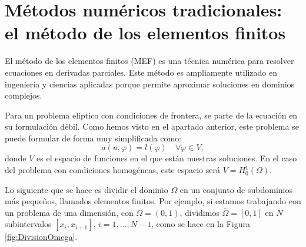 \documentclass[a4paper,11pt,spanish, twoside, leqno]{tfg-uam}
\theoremstyle{definition}
\begin{document}

\section{Métodos numéricos tradicionales: el método de los elementos finitos}

El método de los elementos finitos (MEF) es una técnica numérica para resolver ecuaciones en derivadas parciales. Este método es ampliamente utilizado en ingeniería y ciencias aplicadas porque permite aproximar soluciones en dominios complejos.

Para un problema elíptico con condiciones de frontera, se parte de la ecuación en su formulación débil. Como hemos visto en el apartado anterior, este problema se puede formular de forma muy simplificada como:
\begin{equation*}
    a(u,\varphi) = l(\varphi) \quad \forall \varphi\in V,
\end{equation*}
donde $V$ es el espacio de funciones en el que están nuestras soluciones. En el caso del problema con condiciones homogéneas, este espacio será $V = H_0^1(\Omega)$.

Lo siguiente que se hace es dividir el dominio $\Omega$ en un conjunto de subdominios más pequeños, llamados elementos finitos. Por ejemplo, si estamos trabajando con un problema de una dimensión, con $\Omega =(0,1)$, dividimos $\overline{\Omega} = [0,1]$ en $N$ subintervalos $[x_i,x_{i+1}], \, i = 1, \dots, N-1$, como se hace en la Figura \ref{fig:DivisionOmega}.
\end{document}
